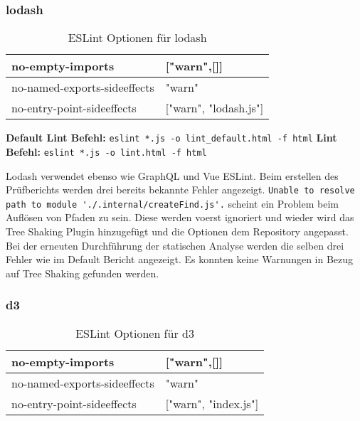 \subsubsection{lodash}
\begin{table}[H]
\centering
\caption{ESLint Optionen für lodash}
\label{tbl:lodash-options}
\begin{tabular}{|l|l|}
\hline
no-empty-imports             & {[}"warn",{[}{]}{]}         \\ \hline
no-named-exports-sideeffects & "warn"                      \\ \hline
no-entry-point-sideeffects   & {[}"warn", "lodash.js"{]} \\ \hline
\end{tabular}
\end{table}

\begin{center}
\textbf{Default Lint Befehl:} \lstinline{eslint *.js -o lint_default.html -f html}\linebreak 
\textbf{Lint Befehl:} \lstinline{eslint *.js -o lint.html -f html}
\end{center}

Lodash verwendet ebenso wie GraphQL und Vue ESLint. Beim erstellen des Prüfberichts werden drei bereits bekannte Fehler angezeigt. \lstinline{Unable to resolve path to module './.internal/createFind.js'.} scheint ein Problem beim Auflösen von Pfaden zu sein. Diese werden voerst ignoriert und wieder wird das Tree Shaking Plugin hinzugefügt und die Optionen dem Repository angepasst. Bei der erneuten Durchführung der statischen Analyse werden die selben drei Fehler wie im Default Bericht angezeigt. Es konnten keine Warnungen in Bezug auf Tree Shaking gefunden werden.

\subsubsection{d3}
\begin{table}[H]
\centering
\caption{ESLint Optionen für d3}
\label{tbl:d3-options}
\begin{tabular}{|l|l|}
\hline
no-empty-imports             & {[}"warn",{[}{]}{]}         \\ \hline
no-named-exports-sideeffects & "warn"                      \\ \hline
no-entry-point-sideeffects   & {[}"warn", "index.js"{]} \\ \hline
\end{tabular}
\end{table}


